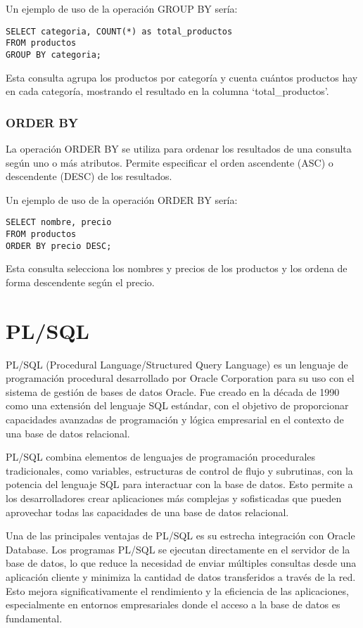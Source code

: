 \documentclass[executivepaper]{article}
\begin{document}
Un ejemplo de uso de la operación GROUP BY sería:

\begin{lstlisting}
SELECT categoria, COUNT(*) as total_productos
FROM productos
GROUP BY categoria;
\end{lstlisting}

Esta consulta agrupa los productos por categoría y cuenta cuántos productos hay en cada categoría, mostrando el resultado en la columna \enquote*{total\_productos}.

\subsubsection*{ORDER BY}

La operación ORDER BY se utiliza para ordenar los resultados de una consulta según uno o más atributos. Permite especificar el orden ascendente (ASC) o descendente (DESC) de los resultados.

Un ejemplo de uso de la operación ORDER BY sería:

\begin{lstlisting}
SELECT nombre, precio
FROM productos
ORDER BY precio DESC;
\end{lstlisting}

Esta consulta selecciona los nombres y precios de los productos y los ordena de forma descendente según el precio.

\newpage

\section{PL/SQL}
PL/SQL (Procedural Language/Structured Query Language) es un lenguaje de programación procedural desarrollado por Oracle Corporation para su uso con el sistema de gestión de bases de datos Oracle. Fue creado en la década de 1990 como una extensión del lenguaje SQL estándar, con el objetivo de proporcionar capacidades avanzadas de programación y lógica empresarial en el contexto de una base de datos relacional.

PL/SQL combina elementos de lenguajes de programación procedurales tradicionales, como variables, estructuras de control de flujo y subrutinas, con la potencia del lenguaje SQL para interactuar con la base de datos. Esto permite a los desarrolladores crear aplicaciones más complejas y sofisticadas que pueden aprovechar todas las capacidades de una base de datos relacional.

Una de las principales ventajas de PL/SQL es su estrecha integración con Oracle Database. Los programas PL/SQL se ejecutan directamente en el servidor de la base de datos, lo que reduce la necesidad de enviar múltiples consultas desde una aplicación cliente y minimiza la cantidad de datos transferidos a través de la red. Esto mejora significativamente el rendimiento y la eficiencia de las aplicaciones, especialmente en entornos empresariales donde el acceso a la base de datos es fundamental.
\end{document}
